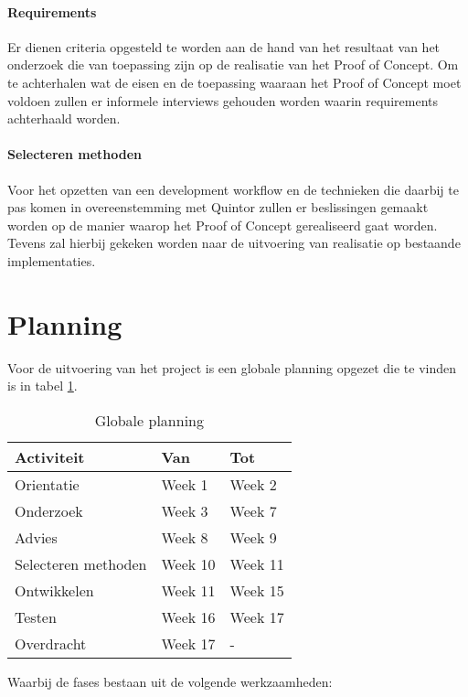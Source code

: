 \paragraph{Requirements} Er dienen criteria opgesteld te worden aan de hand van het resultaat van het onderzoek die van toepassing zijn op de realisatie van het Proof of Concept. Om te achterhalen wat de eisen en de toepassing waaraan het Proof of Concept moet voldoen zullen er informele interviews gehouden worden waarin requirements achterhaald worden.

\paragraph{Selecteren methoden} Voor het opzetten van een development workflow en de technieken die daarbij te pas komen in overeenstemming met Quintor zullen er beslissingen gemaakt worden op de manier waarop het Proof of Concept gerealiseerd gaat worden. Tevens zal hierbij gekeken worden naar de uitvoering van realisatie op bestaande implementaties.

\clearpage
\section{Planning}
Voor de uitvoering van het project is een globale planning opgezet die te vinden is in tabel \ref{planning}.

\begin{table}[ht]
  \begin{tabular}{|p{6cm}|p{4cm}|p{4cm}|}
    \hline
    \textbf{Activiteit} & \textbf{Van} & \textbf{Tot} \\
    \hline
    Orientatie & Week 1 & Week 2 \\
    \hline
    Onderzoek & Week 3 & Week 7 \\
    \hline
    Advies & Week 8 & Week 9 \\
    \hline
    Selecteren methoden & Week 10 & Week 11 \\
    \hline
    Ontwikkelen & Week 11 & Week 15 \\
    \hline
    Testen & Week 16 & Week 17 \\
    \hline
    Overdracht & Week 17 & - \\
    \hline
  \end{tabular}
  \caption{Globale planning}
  \label{planning}
\end{table}

Waarbij de fases bestaan uit de volgende werkzaamheden:

